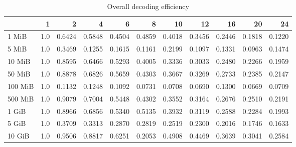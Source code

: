 \begin{table}[!h]
	\caption{Overall decoding efficiency}
\begin{tabular}{lrrrrrrrrrr}
	\toprule
		\diagbox{File sizes }{Threads}  &   1  &      2  &      4  &      6  &      8  &      10 &      12 &      16 &      20 &      24 \\
	\midrule
	1 MiB   &  1.0 &  0.6424 &  0.5848 &  0.4504 &  0.4859 &  0.4018 &  0.3456 &  0.2446 &  0.1818 &  0.1220 \\
	5 MiB   &  1.0 &  0.3469 &  0.1255 &  0.1615 &  0.1161 &  0.2199 &  0.1097 &  0.1331 &  0.0963 &  0.1474 \\
	10 MiB  &  1.0 &  0.8595 &  0.6466 &  0.5293 &  0.4005 &  0.3336 &  0.3033 &  0.2480 &  0.2266 &  0.1959 \\
	50 MiB  &  1.0 &  0.8878 &  0.6826 &  0.5659 &  0.4303 &  0.3667 &  0.3269 &  0.2733 &  0.2385 &  0.2147 \\
	100 MiB &  1.0 &  0.1132 &  0.1248 &  0.1092 &  0.0731 &  0.0708 &  0.0690 &  0.1300 &  0.0669 &  0.0709 \\
	500 MiB &  1.0 &  0.9079 &  0.7004 &  0.5448 &  0.4302 &  0.3552 &  0.3164 &  0.2676 &  0.2510 &  0.2191 \\
	1 GiB   &  1.0 &  0.8966 &  0.6856 &  0.5340 &  0.5135 &  0.3932 &  0.3119 &  0.2588 &  0.2284 &  0.1993 \\
	5 GiB   &  1.0 &  0.3709 &  0.3313 &  0.2870 &  0.2819 &  0.2519 &  0.2300 &  0.2016 &  0.1746 &  0.1633 \\
	10 GiB  &  1.0 &  0.9506 &  0.8817 &  0.6251 &  0.2053 &  0.4908 &  0.4469 &  0.3639 &  0.3041 &  0.2584 \\
	\bottomrule
\end{tabular}
\end{table}

